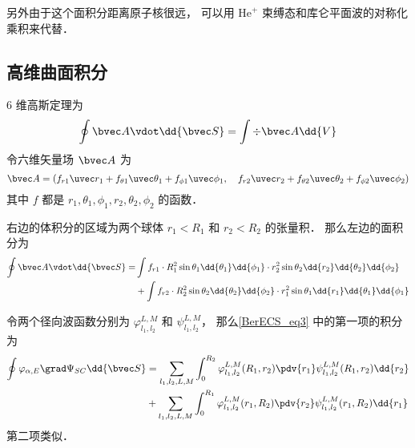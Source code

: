 另外由于这个面积分距离原子核很远， 可以用 $\mathrm{He}^+$ 束缚态和库仑平面波的对称化乘积来代替．

\subsection{高维曲面积分}
6 维高斯定理为
\begin{equation}
\oint \bvec A\vdot \dd{\bvec S} = \int \div \bvec A \dd{V}
\end{equation}
令六维矢量场 $\bvec A$ 为
\begin{equation}
\bvec A = (f_{r1} \uvec r_1 + f_{\theta1}\uvec \theta_1 + f_{\phi1}\uvec \phi_1, \quad f_{r2} \uvec r_2 + f_{\theta2}\uvec \theta_2 + f_{\phi2}\uvec \phi_2)
\end{equation}
其中 $f$ 都是 $r_1,\theta_1,\phi_1,r_2,\theta_2,\phi_2$ 的函数．

右边的体积分的区域为两个球体 $r_1<R_1$ 和 $r_2<R_2$ 的张量积． 那么左边的面积分为
\begin{equation}
\begin{aligned}
\oint \bvec A\vdot \dd{\bvec S} =&\int f_{r1}\cdot  R_1^2\sin\theta_1\dd{\theta_1}\dd{\phi_1}\cdot r_2^2\sin\theta_2 \dd{r_2}\dd{\theta_2}\dd{\phi_2}\\
&+\int f_{r2}\cdot  R_2^2\sin\theta_2\dd{\theta_2}\dd{\phi_2}\cdot r_1^2\sin\theta_1 \dd{r_1}\dd{\theta_1}\dd{\phi_1}
\end{aligned}
\end{equation}

令两个径向波函数分别为 $\varphi_{l_1,l_2}^{L,M}$ 和 $\psi_{l_1,l_2}^{L,M}$， 那么\autoref{BerECS_eq3} 中的第一项的积分为
\begin{equation}
\begin{aligned}
\oint \varphi_{\alpha,E} \grad \Psi_{SC} \dd{\bvec S} &= \sum_{l_1,l_2,L,M}\int_0^{R_2} \varphi_{l_1,l_2}^{L,M}(R_1,r_2) \pdv{r_1} \psi_{l_1,l_2}^{L,M}(R_1,r_2)\dd{r_2}\\
&+\sum_{l_1,l_2,L,M}\int_0^{R_1} \varphi_{l_1,l_2}^{L,M}(r_1,R_2) \pdv{r_2} \psi_{l_1,l_2}^{L,M}(r_1,R_2)\dd{r_1}
\end{aligned}
\end{equation}
第二项类似．
